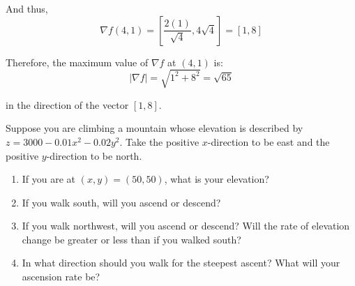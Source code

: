 And thus, 
$$\nabla f(4, 1) = \left[ \frac{2(1)}{\sqrt{4}}, 4\sqrt{4} \right] = \left[ 1, 
8 \right]$$

Therefore, the maximum value of $\nabla f$ at $(4, 1)$ is:
$$\left| \nabla f \right| = \sqrt{1^2 + 8^2} = \sqrt{65}$$

in the direction of the vector $\left[ 1, 8 \right]$. 

\begin{Exercise}[title = {Using the Gradient to find Maximum Change}, 
label = maximum]
Suppose you are climbing a mountain whose elevation is described by $z = 3000 
- 0.01x^2 - 0.02y^2$. Take the positive $x$-direction to be east and the 
positive $y$-direction to be north. 
\begin{enumerate}
    \item If you are at $(x, y) = (50, 50)$, what is your elevation?
    \item If you walk south, will you ascend or descend?
    \item If you walk northwest, will you ascend or descend? Will the rate of 
    elevation change be greater or less than if you walked south?
    \item In what direction should you walk for the steepest ascent? What will 
    your ascension rate be?
\end{enumerate}
\vspace{50mm}
\end{Exercise}

